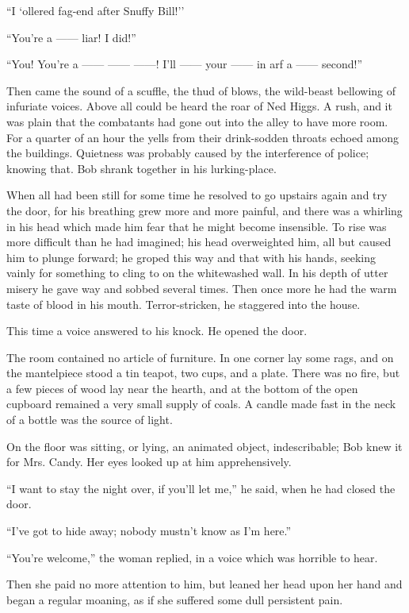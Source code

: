 ``I `ollered fag-end after Snuffy Bill!''

``You're a {{------}} liar! I did!''

``You! You're a {{------}} {{------}} {{------}}! I'll {{------}} your
{{------}} in arf a {{------}} second!''

Then came the sound of a scuffle, the thud of blows, the wild-beast
bellowing of infuriate voices. Above all could be heard the roar of Ned
Higgs. A rush, and it was plain that the combatants had gone out into
the alley to have more room. For a quarter of an hour the yells from
their drink-sodden throats echoed among the buildings. Quietness was
probably caused by the interference of police; knowing that. Bob shrank
together in his lurking-place.

When all had been still for some time he resolved to go upstairs again
and try the door, for his breathing grew more and more painful, and
there was a whirling in his head which made him fear that he might
become insensible. To rise was more difficult than he had imagined; his
head overweighted him, all but caused him to plunge forward; he groped
this {}way and that with his hands, seeking vainly for something to
cling to on the whitewashed wall. In his depth of utter misery he gave
way and sobbed several times. Then once more he had the warm taste of
blood in his mouth. Terror-stricken, he staggered into the house.

This time a voice answered to his knock. He opened the door.

The room contained no article of furniture. In one corner lay some rags,
and on the mantelpiece stood a tin teapot, two cups, and a plate. There
was no fire, but a few pieces of wood lay near the hearth, and at the
bottom of the open cupboard remained a very small supply of coals. A
candle made fast in the neck of a bottle was the source of light.

On the floor was sitting, or lying, an animated object, indescribable;
Bob knew it for Mrs. Candy. Her eyes looked up at him apprehensively.

``I want to stay the night over, if you'll let me,'' he said, when he
had closed the door.

``I've got to hide away; nobody mustn't know as I'm here.''

``You're welcome,'' the woman replied, in a voice which was horrible to
hear.

{}Then she paid no more attention to him, but leaned her head upon her
hand and began a regular moaning, as if she suffered some dull
persistent pain.

